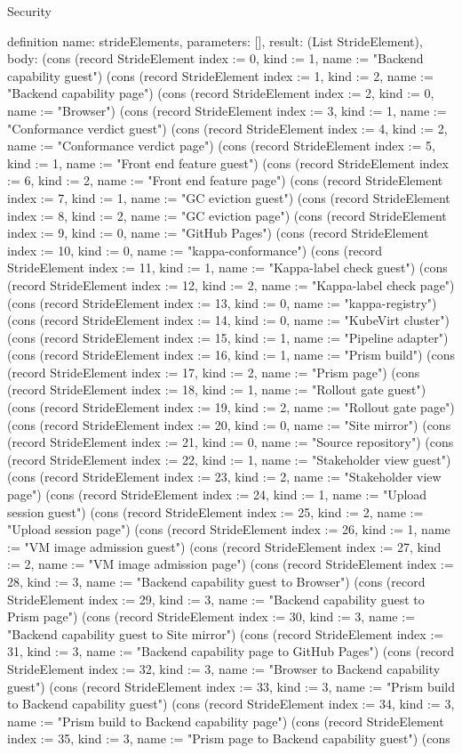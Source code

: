 \begin{lexlean}{Security}
\begin{semanticmodule}
definition{
  name: strideElements,
  parameters: [],
  result: (List StrideElement),
  body: (cons (record StrideElement {index := 0, kind := 1, name := "Backend capability guest"}) (cons (record StrideElement {index := 1, kind := 2, name := "Backend capability page"}) (cons (record StrideElement {index := 2, kind := 0, name := "Browser"}) (cons (record StrideElement {index := 3, kind := 1, name := "Conformance verdict guest"}) (cons (record StrideElement {index := 4, kind := 2, name := "Conformance verdict page"}) (cons (record StrideElement {index := 5, kind := 1, name := "Front end feature guest"}) (cons (record StrideElement {index := 6, kind := 2, name := "Front end feature page"}) (cons (record StrideElement {index := 7, kind := 1, name := "GC eviction guest"}) (cons (record StrideElement {index := 8, kind := 2, name := "GC eviction page"}) (cons (record StrideElement {index := 9, kind := 0, name := "GitHub Pages"}) (cons (record StrideElement {index := 10, kind := 0, name := "kappa-conformance"}) (cons (record StrideElement {index := 11, kind := 1, name := "Kappa-label check guest"}) (cons (record StrideElement {index := 12, kind := 2, name := "Kappa-label check page"}) (cons (record StrideElement {index := 13, kind := 0, name := "kappa-registry"}) (cons (record StrideElement {index := 14, kind := 0, name := "KubeVirt cluster"}) (cons (record StrideElement {index := 15, kind := 1, name := "Pipeline adapter"}) (cons (record StrideElement {index := 16, kind := 1, name := "Prism build"}) (cons (record StrideElement {index := 17, kind := 2, name := "Prism page"}) (cons (record StrideElement {index := 18, kind := 1, name := "Rollout gate guest"}) (cons (record StrideElement {index := 19, kind := 2, name := "Rollout gate page"}) (cons (record StrideElement {index := 20, kind := 0, name := "Site mirror"}) (cons (record StrideElement {index := 21, kind := 0, name := "Source repository"}) (cons (record StrideElement {index := 22, kind := 1, name := "Stakeholder view guest"}) (cons (record StrideElement {index := 23, kind := 2, name := "Stakeholder view page"}) (cons (record StrideElement {index := 24, kind := 1, name := "Upload session guest"}) (cons (record StrideElement {index := 25, kind := 2, name := "Upload session page"}) (cons (record StrideElement {index := 26, kind := 1, name := "VM image admission guest"}) (cons (record StrideElement {index := 27, kind := 2, name := "VM image admission page"}) (cons (record StrideElement {index := 28, kind := 3, name := "Backend capability guest to Browser"}) (cons (record StrideElement {index := 29, kind := 3, name := "Backend capability guest to Prism page"}) (cons (record StrideElement {index := 30, kind := 3, name := "Backend capability guest to Site mirror"}) (cons (record StrideElement {index := 31, kind := 3, name := "Backend capability page to GitHub Pages"}) (cons (record StrideElement {index := 32, kind := 3, name := "Browser to Backend capability guest"}) (cons (record StrideElement {index := 33, kind := 3, name := "Prism build to Backend capability guest"}) (cons (record StrideElement {index := 34, kind := 3, name := "Prism build to Backend capability page"}) (cons (record StrideElement {index := 35, kind := 3, name := "Prism page to Backend capability guest"}) (cons }
\end{semanticmodule}
\end{lexlean}
